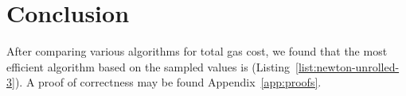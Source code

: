 \section{Conclusion}

After comparing various algorithms for total gas cost,
we found that the most efficient algorithm based on the sampled values is
\UnrolledThree{} (Listing~\ref{list:newton-unrolled-3}).
A proof of correctness may be found Appendix~\ref{app:proofs}.
